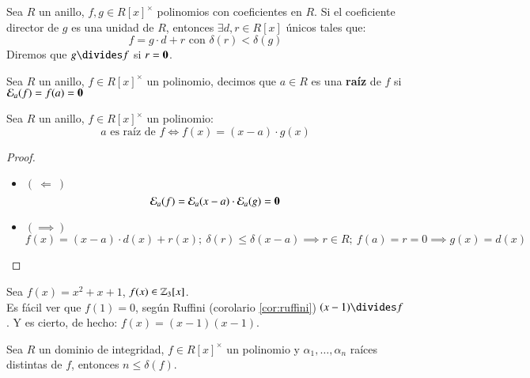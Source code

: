 \begin{pro}
    Sea $R$ un anillo, $f, g \in R[x]^{\times}$ polinomios con coeficientes en $R$. Si el coeficiente director de $g$ es una unidad de $R$, entonces $\exists d,r \in R[x]$ únicos tales que:
    $$
        f = g \cdot d + r \text{ con } \delta(r) < \delta(g)
    $$
    Diremos que $g \divides f$ si $r = \mathbf{0}$.
\end{pro}
\begin{dfn}
    Sea $R$ un anillo, $f \in R[x]^{\times}$ un polinomio, decimos que $a \in R$ es una \textbf{raíz} de $f$ si $\mathcal{E}_a(f) = f(a) = \mathbf{0}$
\end{dfn}
\begin{cor}[Ruffini]\label{cor:ruffini}
    Sea $R$ un anillo, $f \in R[x]^{\times}$ un polinomio:
    $$
        a \text{ es raíz de } f \iff f(x) = (x-a)\cdot g(x)
    $$
\end{cor}
\begin{proof}$ $
    \begin{itemize}
        \item $\left(\  \Longleftarrow\ \right)$
        $$
            \mathcal{E}_a(f) = \mathcal{E}_a(x-a) \cdot \mathcal{E}_a(g) = \mathbf{0}
        $$
        \item $(\implies)$
        $$
            f(x) = (x - a)\cdot d(x) + r(x);\ \delta(r) \leq \delta(x-a) \implies r \in R;\ f(a) = r = 0 \implies g(x) = d(x)
        $$
    \end{itemize}
\end{proof}

\begin{eg}
    Sea $f(x) = x^2 + x + 1$, $f(x) \in \mathbb{Z}_3[x]$.\\ Es fácil ver que $f(1) = 0$, según Ruffini (corolario \ref{cor:ruffini}) $(x-1) \divides f$. Y es cierto, de hecho: $f(x) = (x - 1)(x - 1)$.
\end{eg}

\begin{thm}
    Sea $R$ un dominio de integridad, $f \in R[x]^{\times}$ un polinomio y $\alpha_1, \ldots, \alpha_n$ raíces distintas de $f$, entonces $n \leq \delta(f)$.
\end{thm}

